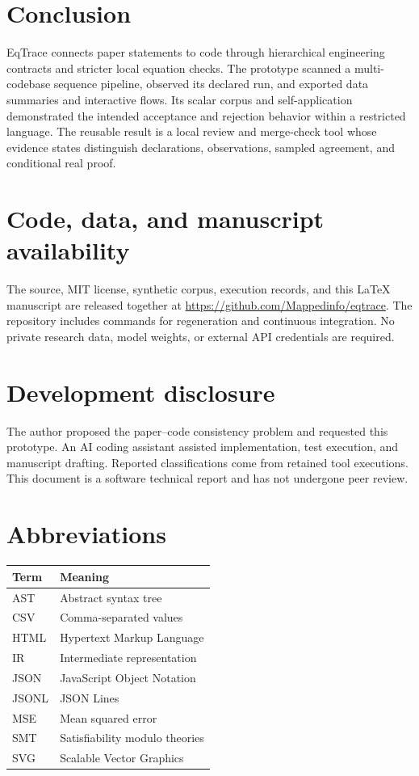 \section{Conclusion}
EqTrace connects paper statements to code through hierarchical engineering contracts and stricter local equation checks. The prototype scanned a multi-codebase sequence pipeline, observed its declared run, and exported data summaries and interactive flows. Its scalar corpus and self-application demonstrated the intended acceptance and rejection behavior within a restricted language. The reusable result is a local review and merge-check tool whose evidence states distinguish declarations, observations, sampled agreement, and conditional real proof.

\section*{Code, data, and manuscript availability}
The source, MIT license, synthetic corpus, execution records, and this LaTeX manuscript are released together at \url{https://github.com/Mappedinfo/eqtrace}. The repository includes commands for regeneration and continuous integration. No private research data, model weights, or external API credentials are required.

\section*{Development disclosure}
The author proposed the paper--code consistency problem and requested this prototype. An AI coding assistant assisted implementation, test execution, and manuscript drafting. Reported classifications come from retained tool executions. This document is a software technical report and has not undergone peer review.

\appendix
\section{Abbreviations}
\begin{center}
\begin{tabular}{ll}
\toprule
Term & Meaning \\
\midrule
AST & Abstract syntax tree \\
CSV & Comma-separated values \\
HTML & Hypertext Markup Language \\
IR & Intermediate representation \\
JSON & JavaScript Object Notation \\
JSONL & JSON Lines \\
MSE & Mean squared error \\
SMT & Satisfiability modulo theories \\
SVG & Scalable Vector Graphics \\
\bottomrule
\end{tabular}
\end{center}
